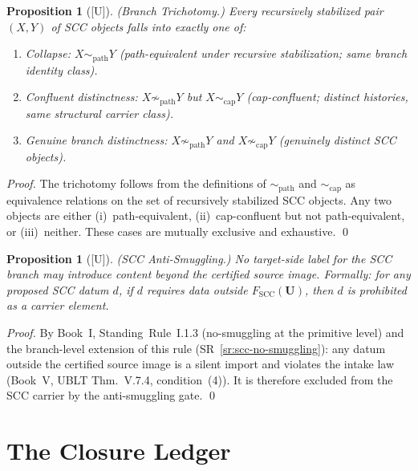\documentclass[12pt,oneside]{amsbook}
\theoremstyle{plain}
\newtheorem{proposition}[theorem]{Proposition}
\theoremstyle{definition}
\theoremstyle{remark}
\newcommand{\status}[1]{\textup{[#1]}}
\newcommand{\spath}{\sim_{\mathrm{path}}}
\newcommand{\scap}{\sim_{\mathrm{cap}}}
\begin{document}
\begin{proposition}[\status{U}]\label{prop:scc-trichotomy}
\textup{(Branch Trichotomy.)} Every recursively stabilized
pair $(X, Y)$ of SCC objects falls into exactly one of:
\begin{enumerate}[label=\textup{(\roman*)}]
 \item \emph{Collapse:} $X \spath Y$ (path-equivalent under
 recursive stabilization; same branch identity class).
 \item \emph{Confluent distinctness:} $X \not\spath Y$ but
 $X \scap Y$ (cap-confluent; distinct histories, same
 structural carrier class).
 \item \emph{Genuine branch distinctness:} $X \not\spath Y$
 and $X \not\scap Y$ (genuinely distinct SCC objects).
\end{enumerate}
\end{proposition}

\begin{proof}
The trichotomy follows from the definitions of $\spath$ and $\scap$
as equivalence relations on the set of recursively stabilized
SCC objects. Any two objects are either (i)~path-equivalent,
(ii)~cap-confluent but not path-equivalent, or (iii)~neither.
These cases are mutually exclusive and exhaustive.
\qed
\end{proof}

\begin{proposition}[\status{U}]\label{prop:scc-antismuggle}
\textup{(SCC Anti-Smuggling.)} No target-side label for the
SCC branch may introduce content beyond the certified source
image. Formally: for any proposed SCC datum $d$, if $d$
requires data outside $F_{\mathrm{SCC}}(\mathbf{U})$, then $d$
is prohibited as a carrier element.
\end{proposition}

\begin{proof}
By Book~I, Standing~Rule~I.1.3 (no-smuggling at the primitive
level) and the branch-level extension of this rule
(SR~\ref{sr:scc-no-smuggling}): any datum outside the certified
source image is a silent import and violates the intake law
(Book~V, UBLT Thm.~V.7.4, condition~(4)). It is therefore
excluded from the SCC carrier by the anti-smuggling gate.
\qed
\end{proof}

\section{The Closure Ledger}
\label{sec:ledger}
\end{document}
